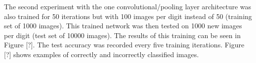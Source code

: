 \documentclass[10pt,twocolumn,letterpaper]{article}
\begin{document}
The second experiment with the one convolutional/pooling layer architecture was also trained for 50 iterations but
with 100 images per digit instead of 50 (training set of 1000 images). This trained network was then tested on 1000
new images per digit (test set of 10000 images). The results of this training can be seen in Figure [?]. The test
accuracy was recorded every five training iterations. Figure [?] shows examples of correctly and incorrectly classified images.



{\small


}
\end{document}
